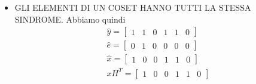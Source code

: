 \begin{enumerate}
{\begin{itemize}
{                            \begin{align}
                                    \hat{x} &= y + \hat{e} =  (y + \hat{e})H^T=y H^T+ \hat{e}H^T= s+s =0 \nonumber \\
                                    &\begin{bmatrix}
                                        0 & 1 & 0 & 0 & 0 & 0
                                        \end{bmatrix}
                                        \begin{bmatrix}
                                        1 & 1 & 0 \\ 
                                        0 & 1 & 1 \\ 
                                        1 & 0 & 1 \\ 
                                        1 & 0 & 0 \\
                                        0 & 1 & 0 \\
                                        0 & 0 & 1 
                                        \end{bmatrix} = 0  \nonumber
                            \end{align}  
                        }
                        \item {GLI ELEMENTI DI UN COSET HANNO TUTTI LA STESSA SINDROME. Abbiamo quindi 
                        \begin{gather}
                            \hat{y} =\begin{bmatrix}
                                1 & 1 & 0 & 1 & 1 & 0
                                \end{bmatrix} \nonumber \\
                            \hat{e} = \begin{bmatrix}
                                0 & 1 & 0 & 0 & 0 & 0
                                \end{bmatrix}\nonumber \\
                            \hat{x} = \begin{bmatrix}
                                1 & 0 & 0 & 1 & 1 & 0
                                \end{bmatrix}\nonumber \\
                            xH^T=
                                \begin{bmatrix}
                                1 & 0 & 0 & 1 & 1 & 0
                                \end{bmatrix}

\end{gather}}
\end{itemize}}
\end{enumerate}
